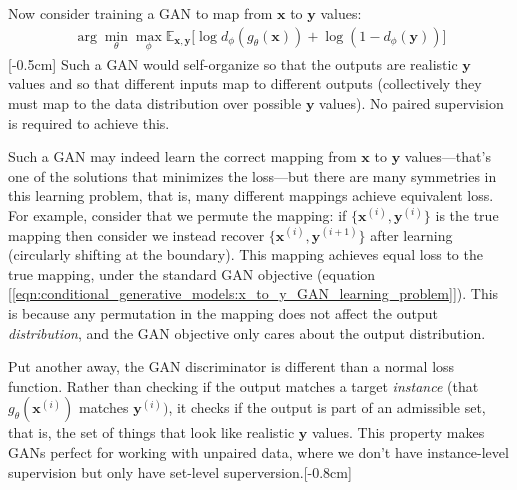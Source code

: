 Now consider training a GAN to map from $\mathbf{x}$ to $\mathbf{y}$ values:
\begin{align}
    \arg\min_{\theta}\max_{\phi} \mathbb{E}_{\mathbf{x},\mathbf{y}} \big[ \log d_{\phi}(g_{\theta}(\mathbf{x})) + \log (1 - d_{\phi}(\mathbf{y})) \big] \label{eqn:conditional_generative_models:x_to_y_GAN_learning_problem}
\end{align}
[-0.5cm]
Such a GAN would self-organize so that the outputs are realistic $\mathbf{y}$ values and so that different inputs map to different outputs (collectively they must map to the data distribution over possible $\mathbf{y}$ values). No paired supervision is required to achieve this.

Such a GAN may indeed learn the correct mapping from $\mathbf{x}$ to $\mathbf{y}$ values—that's one of the solutions that minimizes the loss—but there are many symmetries in this learning problem, that is, many different mappings achieve equivalent loss. For example, consider that we permute the mapping: if $\{\mathbf{x}^{(i)}, \mathbf{y}^{(i)}\}$ is the true mapping then consider we instead recover $\{\mathbf{x}^{(i)}, \mathbf{y}^{(i+1)}\}$ after learning (circularly shifting at the boundary). This mapping achieves equal loss to the true mapping, under the standard GAN objective (equation [\ref{eqn:conditional_generative_models:x_to_y_GAN_learning_problem}]). This is because any permutation in the mapping does not affect the output \textit{distribution}, and the GAN objective only cares about the output distribution.

Put another away, the GAN discriminator is different than a normal loss function. Rather than checking if the output matches a target \textit{instance} (that $g_{\theta}(\mathbf{x}^{(i)})$ matches $\mathbf{y}^{(i)})$, it checks if the output is part of an admissible set, that is, the set of things that look like realistic $\mathbf{y}$ values. This property makes GANs perfect for working with unpaired data, where we don't have instance-level supervision but only have set-level superversion.[-0.8cm]


